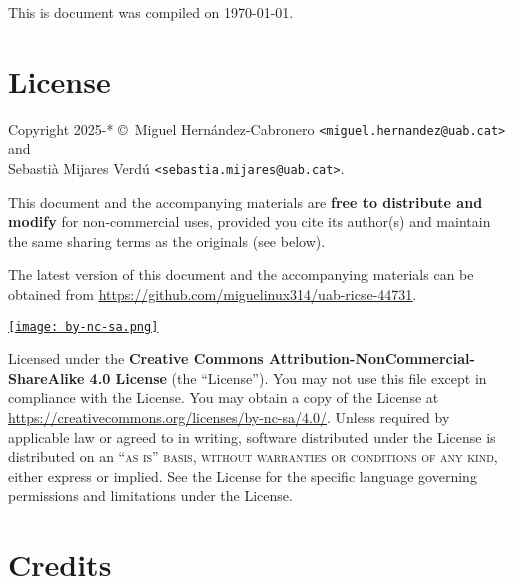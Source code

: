 
\newpage

\thispagestyle{empty}

This is document was compiled on \today.

\section*{License}

\noindent Copyright 2025-* \copyright\ Miguel Hernández-Cabronero \texttt{<miguel.hernandez@uab.cat>} and\\
Sebastià Mijares Verdú \texttt{<sebastia.mijares@uab.cat>}.

\noindent This document and the accompanying materials are \textbf{free to distribute and modify} for non-commercial uses, 
provided you cite its author(s) and maintain the same sharing terms as the originals (see below).

\noindent The latest version of this document and the accompanying materials can be obtained 
from \href{https://github.com/miguelinux314/uab-xoi}{\underline{https://github.com/miguelinux314/uab-ricse-44731}}.

\begin{center}
\noindent\href{https://creativecommons.org/licenses/by-nc-sa/4.0/}{\texttt{[image: by-nc-sa.png]}}
\end{center}

\noindent Licensed under the \textbf{Creative Commons Attribution-NonCommercial-ShareAlike 4.0 License} (the ``License''). You may not use this file except in compliance with the License. You may obtain a copy of the License at \url{https://creativecommons.org/licenses/by-nc-sa/4.0/}. Unless required by applicable law or agreed to in writing, software distributed under the License is distributed on an \textsc{``as is'' basis, without warranties or conditions of any kind}, either express or implied. See the License for the specific language governing permissions and limitations under the License.\\ %

\vfill

\section*{Credits}

